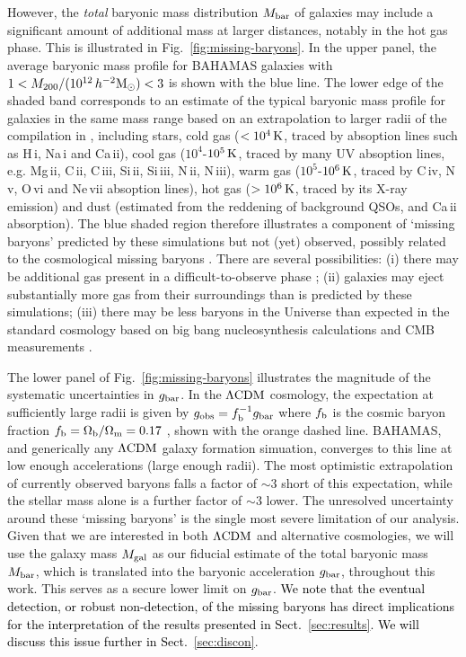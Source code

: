 \documentclass[usenatbib]{mnras}
\newcommand{\hmsun}{\,h^{-2} {\rm M_\odot}}
\newcommand{\lcdm}{{\rm \Lambda CDM}}
\newcommand{\un}[1]{_{\rm #1}}
\begin{document}
However, the \emph{total} baryonic mass distribution $M\un{bar}$ of galaxies may include a significant amount of additional mass at larger distances, notably in the hot gas phase. This is illustrated in Fig.~\ref{fig:missing-baryons}. In the upper panel, the average baryonic mass profile for BAHAMAS galaxies with $1<M_{200}/(10^{12}\hmsun)<3$ is shown with the blue line. The lower edge of the shaded band corresponds to an estimate of the typical baryonic mass profile for galaxies in the same mass range based on an extrapolation to larger radii of the compilation in \citet{tumlinson2017}, including stars, cold gas ($<10^4\,{\rm K}$, traced by absoption lines such as H\,{\sc i}, Na\,{\sc i} and Ca\,{\sc ii}), cool gas ($10^4$-$10^5\,{\rm K}$, traced by many UV absoption lines, e.g. Mg\,{\sc ii}, C\,{\sc ii}, C\,{\sc iii}, Si\,{\sc ii}, Si\,{\sc iii}, N\,{\sc ii}, N\,{\sc iii}), warm gas ($10^5$-$10^6\,{\rm K}$, traced by C\,{\sc iv}, N\,{\sc v}, O\,{\sc vi} and Ne\,{\sc vii} absoption lines), hot gas ($>10^6\,{\rm K}$, traced by its X-ray emission) and dust (estimated from the reddening of background QSOs, and Ca\,{\sc ii} absorption). The blue shaded region therefore illustrates a component of `missing baryons' predicted by these simulations but not (yet) observed, possibly related to the cosmological missing baryons \citep[e.g.][]{fukugita1998,fukugita2004,shull2012}. There are several possibilities: (i) there may be additional gas present in a difficult-to-observe phase \citep[e.g. hot, low-density gas, see for instance][]{nicastro2018}; (ii) galaxies may eject substantially more gas from their surroundings than is predicted by these simulations; (iii) there may be less baryons in the Universe than expected in the standard cosmology based on big bang nucleosynthesis \cite[BBN,][]{kirkman2003} calculations and CMB measurements \cite[]{spergel2003,planck2014}.

The lower panel of Fig.~\ref{fig:missing-baryons} illustrates the magnitude of the systematic uncertainties in $g_{\rm bar}$. In the $\lcdm$ cosmology, the expectation at sufficiently large radii is given by $g\un{obs}=f^{-1}\un{b} g\un{bar}$ where $f\un{b}$ is the cosmic baryon fraction $f\un{b} = \Omega\un{b}/\Omega\un{m} = 0.17$ \cite[]{hinshaw2013}, shown with the orange dashed line. BAHAMAS, and generically any $\lcdm$ galaxy formation simuation, converges to this line at low enough accelerations (large enough radii). The most optimistic extrapolation of currently observed baryons falls a factor of $\sim 3$ short of this expectation, while the stellar mass alone is a further factor of $\sim 3$ lower. The unresolved uncertainty around these `missing baryons' is the single most severe limitation of our analysis. Given that we are interested in both $\lcdm$ and alternative cosmologies, we will use the galaxy mass $M\un{gal}$ as our fiducial estimate of the total baryonic mass $M\un{bar}$, which is translated into the baryonic acceleration $g\un{bar}$, throughout this work. This serves as a secure lower limit on $g\un{bar}$. \textcolor{black}{We note that the eventual detection, or robust non-detection, of the missing baryons has direct implications for the interpretation of the results presented in Sect.~\ref{sec:results}. We will discuss this issue further in Sect.~\ref{sec:discon}}.
\end{document}
